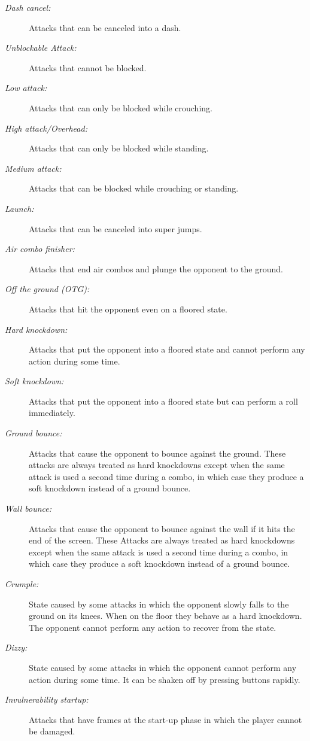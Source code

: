 \documentclass{article}
\begin{document}
\begin{flushleft}
\begin{description}
\item[\textit{Dash cancel:}]  Attacks that can be canceled into a dash.
\item[\textit{Unblockable Attack:}] Attacks that cannot be blocked.
\item[\textit{Low attack:}] Attacks that can only be blocked while crouching.
\item[\textit{High attack/Overhead:}] Attacks that can only be blocked while standing.
\item[\textit{Medium attack:}] Attacks that can be blocked while crouching or standing.
\item[\textit{Launch:}] Attacks that can be canceled into super jumps.
\item[\textit{Air combo finisher:}] Attacks that end air combos and plunge the opponent to the ground.
\item[\textit{Off the ground (OTG):}] Attacks that hit the opponent even on a floored state.
\item[\textit{Hard knockdown:}] Attacks that put the opponent into a floored state and cannot perform any action during some time.
\item[\textit{Soft knockdown:}] Attacks that put the opponent into a floored state but can perform a roll immediately.
\item[\textit{Ground bounce:}] Attacks that cause the opponent to bounce against the ground. These attacks are always treated as hard knockdowns except when the same attack is used a second time during a combo, in which case they produce a soft knockdown instead of a ground bounce.
\item[\textit{Wall bounce:}] Attacks that cause the opponent to bounce against the wall if it hits the end of the screen. These Attacks are always treated as hard knockdowns except when the same attack is used a second time during a combo, in which case they produce a soft knockdown instead of a ground bounce.
\item[\textit{Crumple:}] State caused by some attacks in which the opponent slowly falls to the ground on its knees. When on the floor they behave as a hard knockdown. The opponent cannot perform any action to recover from the state.
\item[\textit{Dizzy:}] State caused by some attacks in which the opponent cannot perform any action during some time. It can be shaken off by pressing buttons rapidly.
\item[\textit{Invulnerability startup:}] Attacks that have frames at the start-up phase in which the player cannot be damaged.

\end{description}
\end{flushleft}
\end{document}
